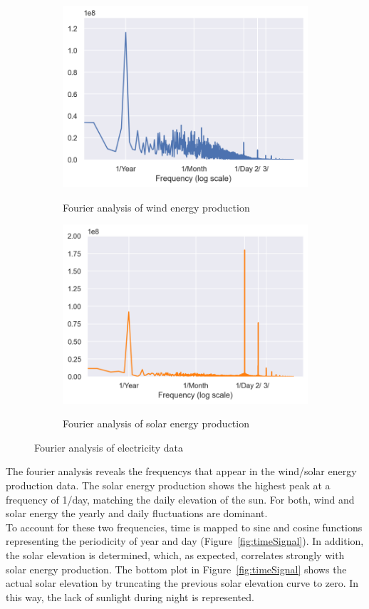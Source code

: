 \documentclass[11pt,table]{article}
\begin{document}
\begin{figure}[H]
\centering
\begin{subfigure}{.5\textwidth}
  \centering
  \includegraphics[width=0.9\linewidth]{Figures/fourierWind.png}
  \label{fig:fourierWind}
  \caption{Fourier analysis of wind energy production}
\end{subfigure}%
\begin{subfigure}{.5\textwidth}
  \centering
  \includegraphics[width=0.9\linewidth]{Figures/fourierSolar.png}
  \label{fig:fourierSolar}
  \caption{Fourier analysis of solar energy production}
\end{subfigure}
\caption{Fourier analysis of electricity data}
\label{fig:fourier}
\end{figure}

The fourier analysis reveals the frequencys that appear in the wind/solar energy production data. The solar energy production shows the highest peak at a frequency of 1/day, matching the daily elevation of the sun. For both, wind and solar energy the yearly and daily fluctuations are dominant.\\
To account for these two frequencies, time is mapped to sine and cosine functions representing the periodicity of year and day (Figure~\ref{fig:timeSignal}). In addition, the solar elevation is determined, which, as expected, correlates strongly with solar energy production. The bottom plot in Figure~\ref{fig:timeSignal} shows the actual solar elevation by truncating the previous solar elevation curve to zero. In this way, the lack of sunlight during night is represented.
\end{document}
